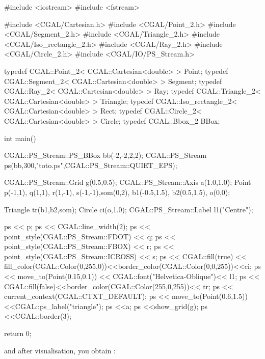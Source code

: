 \begin{cprog}

#include <iostream>
#include <fstream>

#include <CGAL/Cartesian.h>
#include <CGAL/Point_2.h>
#include <CGAL/Segment_2.h>
#include <CGAL/Triangle_2.h>
#include <CGAL/Iso_rectangle_2.h>
#include <CGAL/Ray_2.h>
#include <CGAL/Circle_2.h>
#include <CGAL/IO/PS_Stream.h>

typedef CGAL::Point_2< CGAL::Cartesian<double> >     Point;
typedef CGAL::Segment_2< CGAL::Cartesian<double> >   Segment;
typedef CGAL::Ray_2< CGAL::Cartesian<double> >       Ray;
typedef CGAL::Triangle_2< CGAL::Cartesian<double> >  Triangle;
typedef CGAL::Iso_rectangle_2< CGAL::Cartesian<double> > Rect;
typedef CGAL::Circle_2< CGAL::Cartesian<double> >    Circle;
typedef CGAL::Bbox_2 BBox;

int  main()
{

CGAL::PS_Stream::PS_BBox bb(-2,-2,2,2);
CGAL::PS_Stream ps(bb,300,"toto.ps",CGAL::PS_Stream::QUIET_EPS);

CGAL::PS_Stream::Grid g(0.5,0.5);
CGAL::PS_Stream::Axis a(1.0,1.0);
Point p(-1,1), q(1,1), r(1,-1), s(-1,-1),som(0,2), b1(-0.5,1.5),
   b2(0.5,1.5), o(0,0);

Triangle tr(b1,b2,som);
Circle ci(o,1.0);
CGAL::PS_Stream::Label l1("Centre");

ps << p;
ps << CGAL::line_width(2);    
ps << point_style(CGAL::PS_Stream::FDOT) << q;
ps << point_style(CGAL::PS_Stream::FBOX) << r;
ps << point_style(CGAL::PS_Stream::ICROSS) << s;
 ps << CGAL::fill(true) <<
fill_color(CGAL::Color(0,255,0))<<border_color(CGAL::Color(0,0,255))<<ci;
ps << move_to(Point(0.15,0.1)) << CGAL::font("Helvetica-Oblique")<< l1;
ps << CGAL::fill(false)<<border_color(CGAL::Color(255,0,255))<< tr;
ps << current_context(CGAL::CTXT_DEFAULT);
ps << move_to(Point(0.6,1.5)) <<CGAL::ps_label("triangle");
ps <<a;
ps <<show_grid(g);
ps <<CGAL::border(3);

return 0;
}


\end{cprog}

and after visualisation, you obtain :\\
\\

